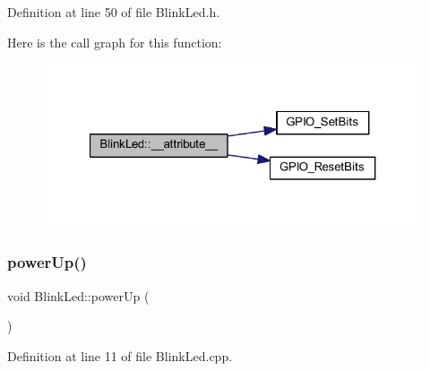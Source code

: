 Definition at line 50 of file Blink\+Led.\+h.

Here is the call graph for this function\+:
\nopagebreak
\begin{figure}[H]
\begin{center}
\leavevmode
\includegraphics[width=321pt]{class_blink_led_a9f8f662f733e131e6477161ac785f665_cgraph}
\end{center}
\end{figure}
\mbox{\label{class_blink_led_a38fcbc34c6ff8a1083b64bbbb309a54c}} 
\subsubsection{\texorpdfstring{power\+Up()}{powerUp()}}
{\footnotesize\ttfamily void Blink\+Led\+::power\+Up (\begin{DoxyParamCaption}{ }\end{DoxyParamCaption})}



Definition at line 11 of file Blink\+Led.\+cpp.

